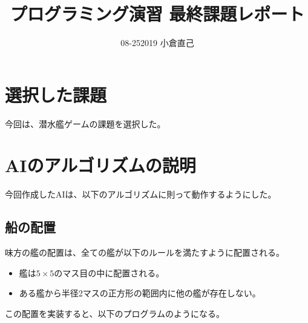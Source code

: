 \documentclass[a4paper,10pt]{ltjsarticle}
\title{プログラミング演習 最終課題レポート}
\author{08-252019 小倉直己}
\date{\empty}
\begin{document}
\maketitle

\section{選択した課題}
今回は、潜水艦ゲームの課題を選択した。

\section{AIのアルゴリズムの説明}
今回作成したAIは、以下のアルゴリズムに則って動作するようにした。

\subsection{船の配置}

味方の艦の配置は、全ての艦が以下のルールを満たすように配置される。
\begin{itemize}
    \item 艦は$5 \times 5$のマス目の中に配置される。
    \item ある艦から半径2マスの正方形の範囲内に他の艦が存在しない。
\end{itemize}

この配置を実装すると、以下のプログラムのようになる。
\end{document}
